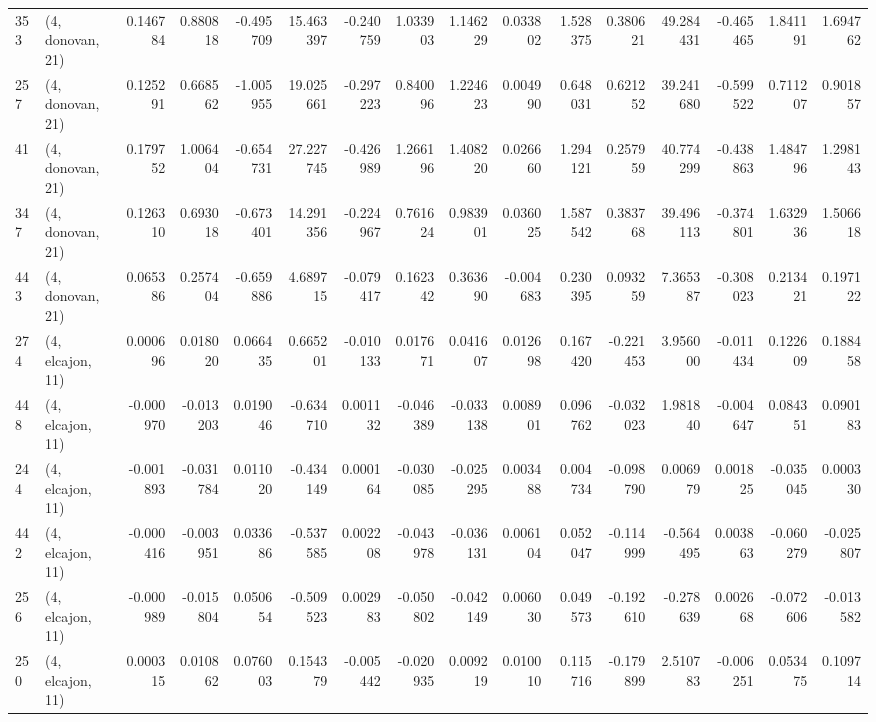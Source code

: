 \begin{tabular}{llrrrrrrrrrrrrrr}
353 &  (4, donovan, 21) &   0.146784 &  0.880818 & -0.495709 &    15.463397 &  -0.240759 &   1.033903 &   1.146229 &  0.033802 &  1.528375 &  0.380621 &   49.284431 & -0.465465 &  1.841191 &  1.694762 \\
257 &  (4, donovan, 21) &   0.125291 &  0.668562 & -1.005955 &    19.025661 &  -0.297223 &   0.840096 &   1.224623 &  0.004990 &  0.648031 &  0.621252 &   39.241680 & -0.599522 &  0.711207 &  0.901857 \\
41  &  (4, donovan, 21) &   0.179752 &  1.006404 & -0.654731 &    27.227745 &  -0.426989 &   1.266196 &   1.408220 &  0.026660 &  1.294121 &  0.257959 &   40.774299 & -0.438863 &  1.484796 &  1.298143 \\
347 &  (4, donovan, 21) &   0.126310 &  0.693018 & -0.673401 &    14.291356 &  -0.224967 &   0.761624 &   0.983901 &  0.036025 &  1.587542 &  0.383768 &   39.496113 & -0.374801 &  1.632936 &  1.506618 \\
443 &  (4, donovan, 21) &   0.065386 &  0.257404 & -0.659886 &     4.689715 &  -0.079417 &   0.162342 &   0.363690 & -0.004683 &  0.230395 &  0.093259 &    7.365387 & -0.308023 &  0.213421 &  0.197122 \\
274 &  (4, elcajon, 11) &   0.000696 &  0.018020 &  0.066435 &     0.665201 &  -0.010133 &   0.017671 &   0.041607 &  0.012698 &  0.167420 & -0.221453 &    3.956000 & -0.011434 &  0.122609 &  0.188458 \\
448 &  (4, elcajon, 11) &  -0.000970 & -0.013203 &  0.019046 &    -0.634710 &   0.001132 &  -0.046389 &  -0.033138 &  0.008901 &  0.096762 & -0.032023 &    1.981840 & -0.004647 &  0.084351 &  0.090183 \\
244 &  (4, elcajon, 11) &  -0.001893 & -0.031784 &  0.011020 &    -0.434149 &   0.000164 &  -0.030085 &  -0.025295 &  0.003488 &  0.004734 & -0.098790 &    0.006979 &  0.001825 & -0.035045 &  0.000330 \\
442 &  (4, elcajon, 11) &  -0.000416 & -0.003951 &  0.033686 &    -0.537585 &   0.002208 &  -0.043978 &  -0.036131 &  0.006104 &  0.052047 & -0.114999 &   -0.564495 &  0.003863 & -0.060279 & -0.025807 \\
256 &  (4, elcajon, 11) &  -0.000989 & -0.015804 &  0.050654 &    -0.509523 &   0.002983 &  -0.050802 &  -0.042149 &  0.006030 &  0.049573 & -0.192610 &   -0.278639 &  0.002668 & -0.072606 & -0.013582 \\
250 &  (4, elcajon, 11) &   0.000315 &  0.010862 &  0.076003 &     0.154379 &  -0.005442 &  -0.020935 &   0.009219 &  0.010010 &  0.115716 & -0.179899 &    2.510783 & -0.006251 &  0.053475 &  0.109714 \\

\end{tabular}
